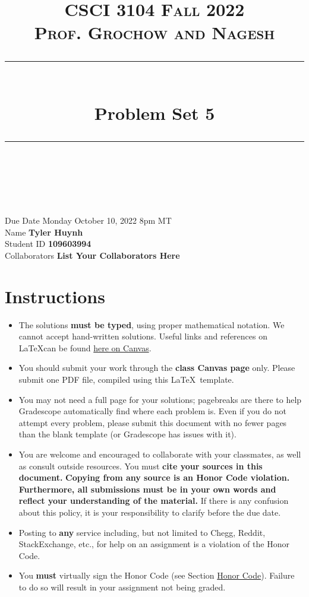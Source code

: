 \documentclass[11pt]{article}
\title{
\normalfont \normalsize 
\textsc{CSCI 3104 Fall 2022 \\ 
Prof. Grochow and Nagesh} \\
[10pt] 
\rule{\linewidth}{0.5pt} \\[6pt] 
\huge Problem Set 5 \\
\rule{\linewidth}{2pt}  \\[10pt]
}
\date{}
\theoremstyle{definition}
\theoremstyle{definition}
\theoremstyle{definition}
\begin{document}
\maketitle


\noindent
Due Date \dotfill Monday October 10, 2022 8pm MT \\
Name \dotfill \textbf{Tyler Huynh} \\
Student ID \dotfill \textbf{109603994} \\
Collaborators \dotfill \textbf{List Your Collaborators Here}

\tableofcontents

\section*{Instructions}
 \begin{itemize}
	\item The solutions \textbf{must be typed}, using proper mathematical notation. We cannot accept hand-written solutions. Useful links and references on \LaTeX can be found \href{https://canvas.colorado.edu/courses/75824/pages/latex}{here on Canvas}.
	\item You should submit your work through the \textbf{class Canvas page} only. Please submit one PDF file, compiled using this \LaTeX \ template.
	\item You may not need a full page for your solutions; pagebreaks are there to help Gradescope automatically find where each problem is. Even if you do not attempt every problem, please submit this document with no fewer pages than the blank template (or Gradescope has issues with it).

	\item You are welcome and encouraged to collaborate with your classmates, as well as consult outside resources. You must \textbf{cite your sources in this document.} \textbf{Copying from any source is an Honor Code violation. Furthermore, all submissions must be in your own words and reflect your understanding of the material.} If there is any confusion about this policy, it is your responsibility to clarify before the due date. 

	\item Posting to \textbf{any} service including, but not limited to Chegg, Reddit, StackExchange, etc., for help on an assignment is a violation of the Honor Code.

	\item You \textbf{must} virtually sign the Honor Code (see Section \hyperlink{HonorCode}{Honor Code}). Failure to do so will result in your assignment not being graded.
\end{itemize}
\end{document}
